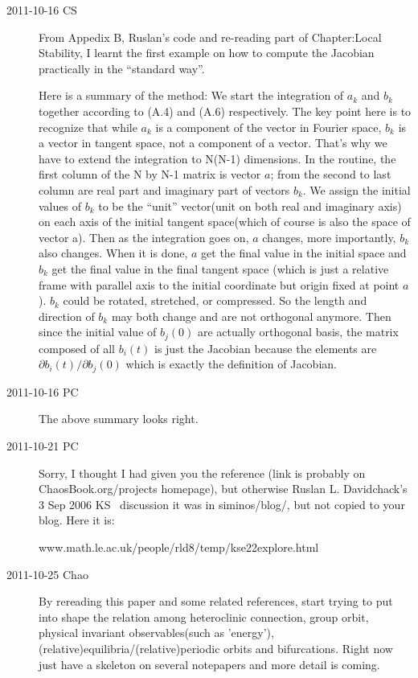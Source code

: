 \begin{description}
\item[2011-10-16 CS]
From Appedix B, Ruslan's code and re-reading part of Chapter:Local Stability,
I learnt the first example on how to compute the Jacobian practically in the
``standard way''.

Here is a summary of the method:
We start the integration of ${a_k}$ and ${b_k}$ together according to
(A.4) and (A.6) respectively. The key point here is to recognize that
while ${a_k}$ is a component of the vector in Fourier space, $b_k$ is a
vector in tangent space, not a component of a vector. That's why we have
to extend the integration to N(N-1) dimensions. In the routine, the first
column of the N by N-1 matrix is vector $a$; from the second to last
column are real part and imaginary part of vectors ${b_k}$. We assign the
initial values of ${b_k}$ to be the ``unit'' vector(unit on both real and
imaginary axis) on each axis of the initial tangent space(which of course
is also the space of vector a). Then as the integration goes on, $a$
changes, more importantly, ${b_k}$ also changes. When it is done, $a$ get
the final value in the initial space and ${b_k}$ get the final value in
the final tangent space (which is just a relative frame with parallel axis
to the initial coordinate but origin fixed at point $a$). ${b_k}$ could
be rotated, stretched, or compressed. So the length and direction of
${b_k}$ may both change and are not orthogonal anymore. Then since the
initial value of ${b_j(0)}$ are actually orthogonal basis, the matrix
composed of all ${b_i(t)}$ is just the Jacobian because the elements are
$\partial{b_i(t)}/\partial{b_j(0)}$ which is exactly the definition of
Jacobian.

\item[2011-10-16 PC] The above summary looks right.

\item[2011-10-21 PC] Sorry, I thought I had given you
the reference (link is probably on ChaosBook.org/projects
homepage), but otherwise Ruslan L. Davidchack's 3 Sep 2006
KS \eqva\ discussion it was in siminos/blog/, but not copied to
your blog. Here it is:

{www.math.le.ac.uk/people/rld8/temp/kse22explore.html}

\item[2011-10-25 Chao] By rereading this paper and some related references, start trying to put into shape the relation among heteroclinic connection, group orbit, physical invariant observables(such as 'energy'), (relative)equilibria/(relative)periodic orbits and bifurcations. Right now just have a skeleton on several notepapers and more detail is coming. 
\end{description}
